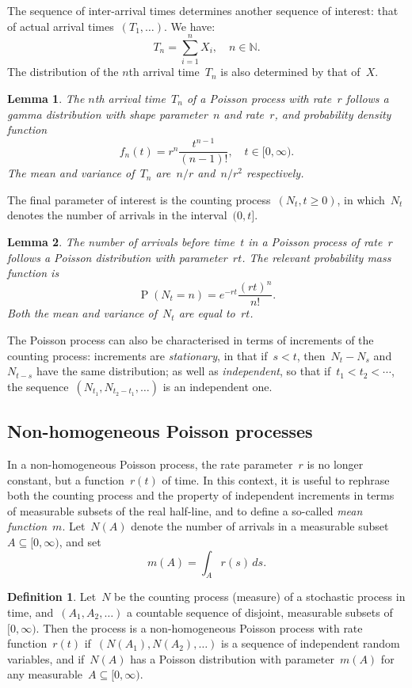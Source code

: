 \documentclass[11pt,a4paper]{article}
\newcommand\mb[1]{\mathbb{#1}}                   %
\DeclareMathOperator\Pb{P}                       %
\newtheorem{lem}{Lemma}
\theoremstyle{definition}
\newtheorem{defn}{Definition}
\begin{document}
The sequence of inter-arrival times determines another sequence of interest:
that of actual arrival times~$(T_1,\dots)$. We have:
\[ T_n = \sum_{i=1}^n X_i, \quad n \in \mb{N}. \]
The distribution of the $n$th arrival time~$T_n$ is also determined by that
of~$X$.
\begin{lem}
The $n$th arrival time~$T_n$ of a Poisson process with rate~$r$ follows a gamma
distribution with shape parameter~$n$ and rate~$r$, and probability density
function
\[ f_n(t) = r^n \frac{t^{n-1}}{(n-1)!}, \quad t \in [0,\infty). \]
The mean and variance of~$T_n$ are~$n/r$ and~$n/r^2$ respectively.
\end{lem}

The final parameter of interest is the counting process~$(N_t, t\ge0)$, in
which~$N_t$ denotes the number of arrivals in the interval~$(0,t]$.
\begin{lem}
The number of arrivals before time~$t$ in a Poisson process of rate~$r$ follows
a Poisson distribution with parameter~$rt$. The relevant probability mass
function is
\[ \Pb(N_t = n) = e^{-rt} \frac{(rt)^n}{n!}. \]
Both the mean and variance of~$N_t$ are equal to~$rt$.
\end{lem}
The Poisson process can also be characterised in terms of increments of the
counting process: increments are \emph{stationary}, in that if~$s<t$, then~$N_t
- N_s$ and~$N_{t-s}$ have the same distribution; as well as \emph{independent},
so that if~$t_1 < t_2 < \dotsb$, the sequence~$(N_{t_1},N_{t_2-t_1},\dots)$ is
an independent one.

\subsection{Non-homogeneous Poisson processes} %
\label{sec:non-homogeneous}

In a non-homogeneous Poisson process, the rate parameter~$r$ is no longer
constant, but a function~$r(t)$ of time. In this context, it is useful to
rephrase both the counting process and the property of independent increments in
terms of measurable subsets of the real half-line, and to define a so-called
\emph{mean function}~$m$. Let~$N(A)$ denote the number of arrivals in a
measurable subset~$A \subseteq [0,\infty)$, and set
\[ m(A) = \int_A r(s)\,ds. \]

\begin{defn}
Let~$N$ be the counting process (measure) of a stochastic process in time,
and~$(A_1,A_2, \dots)$ a countable sequence of disjoint, measurable subsets
of~$[0,\infty)$. Then the process is a non-homogeneous Poisson process with rate
function~$r(t)$ if~$(N(A_1),N(A_2),\dots)$ is a sequence of independent random
variables, and if~$N(A)$ has a Poisson distribution with parameter~$m(A)$ for
any measurable~$A \subseteq [0,\infty)$.
\end{defn}
\end{document}
